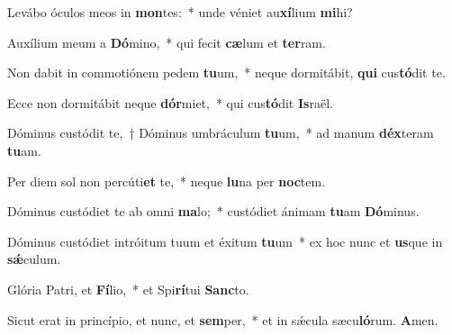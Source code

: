 \item Levábo óculos meos in \textbf{mon}tes:~* unde véniet au\textbf{xí}lium \textbf{mi}hi?

\item Auxílium meum a \textbf{Dó}mino,~* qui fecit \textbf{cæ}lum et \textbf{ter}ram.

\item Non dabit in commotiónem pedem \textbf{tu}um,~* neque dormitábit, \textbf{qui} cus\textbf{tó}dit te.

\item Ecce non dormitábit neque \textbf{dór}miet,~* qui cus\textbf{tó}dit \textbf{Is}raël.

\item Dóminus custódit te,~† Dóminus umbráculum \textbf{tu}um,~* ad manum \textbf{déx}teram \textbf{tu}am.

\item Per diem sol non percúti\textbf{et} te,~* neque \textbf{lu}na per \textbf{noc}tem.

\item Dóminus custódiet te ab omni \textbf{ma}lo;~* custódiet ánimam \textbf{tu}am \textbf{Dó}minus.

\item Dóminus custódiet intróitum tuum et éxitum \textbf{tu}um~* ex hoc nunc et \textbf{us}que in \textbf{sǽ}culum.

\item Glória Patri, et \textbf{Fí}lio,~* et Spi\textbf{rí}tui \textbf{Sanc}to.

\item Sicut erat in princípio, et nunc, et \textbf{sem}per,~* et in sǽcula sæcu\textbf{ló}rum. \textbf{A}men.